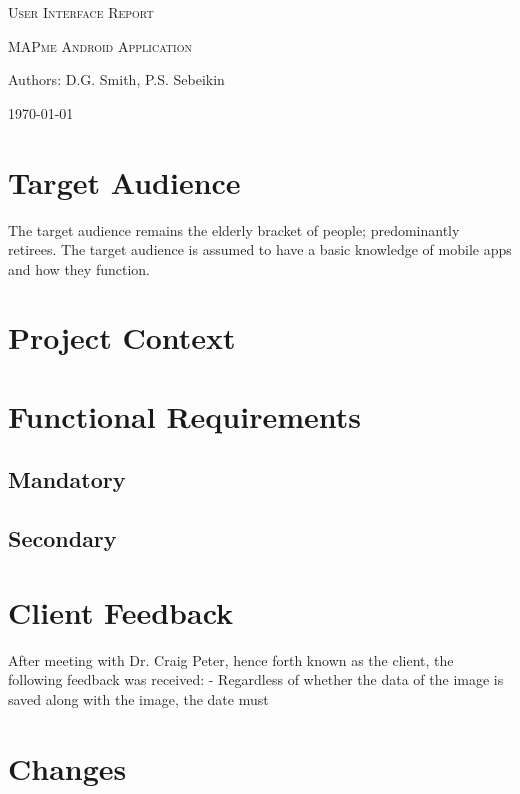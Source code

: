 \documentclass[12pt,a4paper,oneside]{report}
\begin{document}
\begin{titlepage}
	\centering
	{\scshape\LARGE User Interface Report \par}
	\vspace{1cm}
	{\scshape\Large MAPme Android Application\par}
	\vspace{1.5cm}
	{\LARGE Authors: D.G. Smith, P.S. Sebeikin\par}
	\vspace{2cm}
	{\large \today\par}
\end{titlepage}
\tableofcontents
\pagebreak

\section{Target Audience}
The target audience remains the elderly bracket of people; predominantly retirees.  The target audience is assumed to have a basic knowledge of mobile apps and how they function.

\section{Project Context}

\section{Functional Requirements}
\subsection{Mandatory}
\subsection{Secondary}

\section{Client Feedback}
After meeting with Dr. Craig Peter, hence forth known as the client, the following feedback was received:
- Regardless of whether the data of the image is saved along with the image, the date must

\section{Changes}
\end{document}
